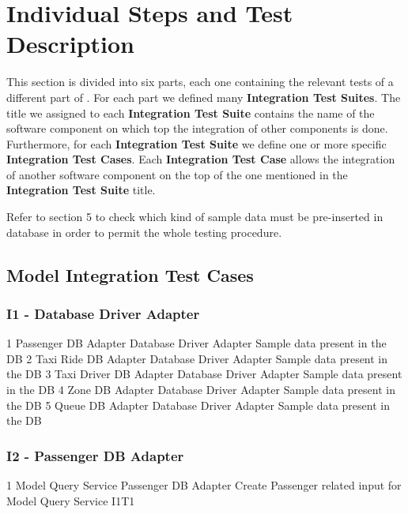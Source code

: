 \section{Individual Steps and Test Description}
\label{sec:section_3}
This section is divided into six parts, each one containing the relevant tests of a different part of \myTaxiService{}.
For each part we defined many \textbf{Integration Test Suites}.
The title we assigned to each \textbf{Integration Test Suite} contains the name of the software component on which top the integration of other components is done.
Furthermore, for each \textbf{Integration Test Suite} we define one or more specific \textbf{Integration Test Cases}.
Each \textbf{Integration Test Case} allows the integration of another software component on the top of the one mentioned in the \textbf{Integration Test Suite} title.\par
Refer to section 5 to check which kind of sample data must be pre-inserted in \myTaxiService{} database in order to permit the whole testing procedure.

\subsection{Model Integration Test Cases}
\subsubsection{I1 - Database Driver Adapter}
\testCaseStdInOut
	{1}
	{Passenger DB Adapter}
	{Database Driver Adapter}
	{Sample data present in the DB}
\testCaseStdInOut
	{2}
	{Taxi Ride DB Adapter}
	{Database Driver Adapter}
	{Sample data present in the DB}
\testCaseStdInOut
	{3}
	{Taxi Driver DB Adapter}
	{Database Driver Adapter}
	{Sample data present in the DB}
\testCaseStdInOut
	{4}
	{Zone DB Adapter}
	{Database Driver Adapter}
	{Sample data present in the DB}
\testCaseStdInOut
	{5}
	{Queue DB Adapter}
	{Database Driver Adapter}
	{Sample data present in the DB}
\subsubsection{I2 - Passenger DB Adapter}
\testCaseStdOut
	{1}
	{Model Query Service}
	{Passenger DB Adapter}
	{Create Passenger related input for Model Query Service}
	{I1T1}
